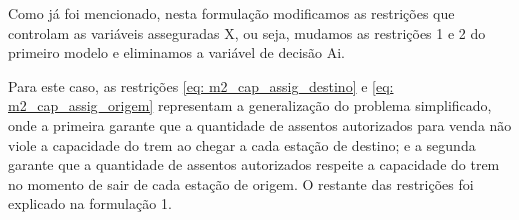 Como já foi mencionado, nesta formulação modificamos as restrições que controlam as variáveis asseguradas X, ou seja, mudamos as restrições 1 e 2 do primeiro modelo e eliminamos a variável de decisão Ai.



Para este caso, as restrições \ref{eq: m2_cap_assig_destino} e \ref{eq: m2_cap_assig_origem} representam a generalização do problema simplificado, onde a primeira garante que a quantidade de assentos autorizados para venda não viole a capacidade do trem ao chegar a cada estação de destino; e a segunda garante que a quantidade de assentos autorizados respeite a capacidade do trem no momento de sair de cada estação de origem. O restante das restrições foi explicado na formulação 1.